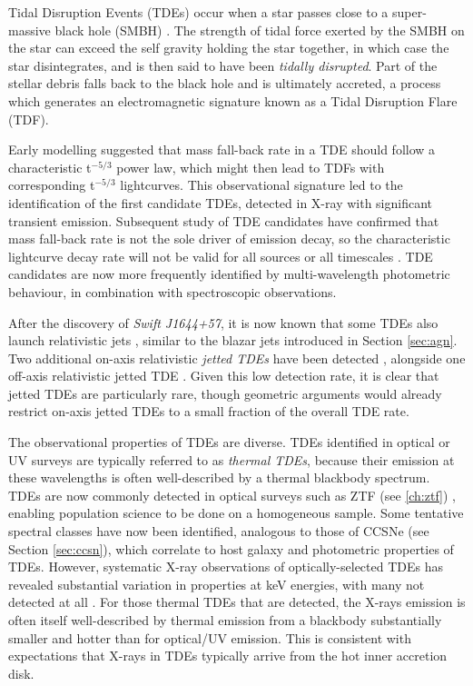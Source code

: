 Tidal Disruption Events (TDEs) occur when a star passes close to a super-massive black hole (SMBH) . The strength of tidal force exerted by the SMBH on the star can exceed the self gravity holding the star together, in which case the star disintegrates, and is then said to have been \emph{tidally disrupted}. Part of the stellar debris falls back to the black hole and is ultimately accreted, a process which generates an electromagnetic signature known as a Tidal Disruption Flare (TDF).

Early modelling  suggested that mass fall-back rate in a TDE should follow a characteristic t$^{-5/3}$ power law, which might then lead to TDFs with corresponding t$^{-5/3}$ lightcurves. This observational signature led to the identification  of the first candidate TDEs, detected in X-ray with significant transient emission. Subsequent study of TDE candidates have confirmed that mass fall-back rate is not the sole driver of emission decay, so the characteristic lightcurve decay rate will not be valid for all sources or all timescales . TDE candidates are now more frequently identified by multi-wavelength photometric behaviour, in combination with spectroscopic observations.

After the discovery of \emph{Swift J1644+57}, it is now known that some TDEs also launch relativistic jets , similar to the blazar jets introduced in Section \ref{sec:agn}. Two additional on-axis relativistic \emph{jetted TDEs} have been detected \cite{auchettl_17}, alongside one off-axis relativistic jetted TDE . Given this low detection rate, it is clear that jetted TDEs are particularly rare, though geometric arguments would already restrict on-axis jetted TDEs to a small fraction of the overall TDE rate.

The observational properties of TDEs are diverse. TDEs identified in optical or UV surveys are typically referred to as \emph{thermal TDEs}, because their emission at these wavelengths is often well-described by a thermal blackbody spectrum. TDEs are now commonly detected in optical surveys such as ZTF (see \ref{ch:ztf}) , enabling population science to be done on a homogeneous sample. Some tentative spectral classes have now been identified, analogous to those of CCSNe (see Section \ref{sec:ccsn}), which correlate to host galaxy and photometric properties of TDEs. However, systematic X-ray observations of optically-selected TDEs has revealed substantial variation in properties at keV energies, with many not detected at all \cite{van_velzen_20}. For those thermal TDEs that are detected, the X-rays emission is often itself well-described by thermal emission from a blackbody substantially smaller and hotter than for optical/UV emission. This is consistent with expectations that X-rays in TDEs typically arrive from the hot inner accretion disk. 

